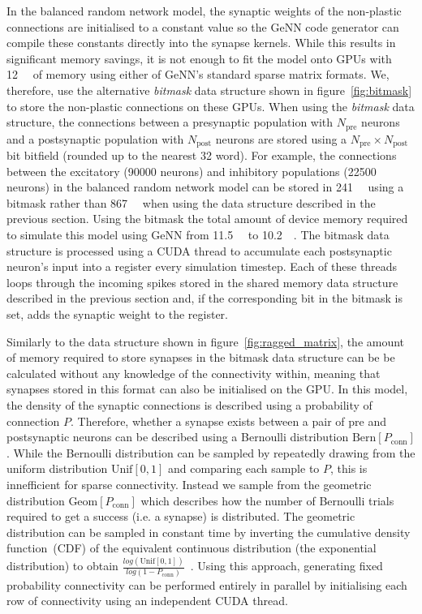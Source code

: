 \documentclass[utf8]{frontiersSCNS} %
\begin{document}
In the balanced random network model, the synaptic weights of the non-plastic connections are initialised to a constant value so the GeNN code generator can compile these constants directly into the synapse kernels. 
While this results in significant memory savings, it is not enough to fit the model onto GPUs with \SI{12}{\giga\byte} of memory using either of GeNN's standard sparse matrix formats.
We, therefore, use the alternative \textit{bitmask} data structure shown in figure~\ref{fig:bitmask} to store the non-plastic connections on these GPUs.
When using the \textit{bitmask} data structure, the connections between a presynaptic population with $N_{\text{pre}}$ neurons and a postsynaptic population with $N_{\text{post}}$ neurons are stored using a $N_{\text{pre}} \times N_{\text{post}}$ bit bitfield (rounded up to the nearest \SI{32}{\bit} word).
For example, the connections between the excitatory (\num{90000} neurons) and inhibitory populations (\num{22500} neurons) in the balanced random network model can be stored in \SI{241}{\mebi\byte} using a bitmask rather than \SI{867}{\mebi\byte} when using the data structure described in the previous section.
Using the bitmask the total amount of device memory required to simulate this model using GeNN from \SI{11.5}{\giga\byte} to \SI{10.2}{\giga\byte}.
The bitmask data structure is processed using a CUDA thread to accumulate each postsynaptic neuron's input into a register every simulation timestep.
Each of these threads loops through the incoming spikes stored in the shared memory data structure described in the previous section and, if the corresponding bit in the bitmask is set, adds the synaptic weight to the register.

Similarly to the data structure shown in figure~\ref{fig:ragged_matrix}, the amount of memory required to store synapses in the bitmask data structure can be be calculated without any knowledge of the connectivity within, meaning that synapses stored in this format can also be initialised on the GPU.
In this model, the density of the synaptic connections is described using a probability of connection $P$.
Therefore, whether a synapse exists between a pair of pre and postsynaptic neurons can be described using a Bernoulli distribution $\text{Bern}[P_{\text{conn}}]$.
While the Bernoulli distribution can be sampled by repeatedly drawing from the uniform distribution $\text{Unif}[0, 1]$ and comparing each sample to $P$, this is innefficient for sparse connectivity.
Instead we sample from the geometric distribution $\text{Geom}[P_{\text{conn}}]$ which describes how the number of Bernoulli trials required to get a success (i.e. a synapse) is distributed.
The geometric distribution can be sampled in constant time by inverting the cumulative density function~(CDF) of the equivalent continuous distribution (the exponential distribution) to obtain $\frac{log(\text{Unif}[0, 1])}{log(1 - P_{\text{conn}})}$~\citep[p499]{DevroyeLuc2013}.
Using this approach, generating fixed probability connectivity can be performed entirely in parallel by initialising each row of connectivity using an independent CUDA thread.
\end{document}
